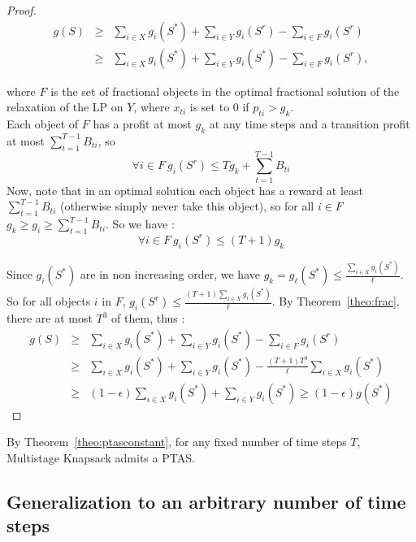 \documentclass[a4paper]{book}
\newtheorem{proof}{\noindent{\bf Proof.} }
\begin{document}
\begin{proof}
\begin{eqnarray*}
g(S) & \geq & \sum_{i\in X} g_i(S^*)+\sum_{i\in Y} g_i(S^r)-\sum_{i\in F} g_i(S^r)\\
& \geq & \sum_{i\in X} g_i(S^*)+\sum_{i\in Y} g_i(S^*)-\sum_{i\in F} g_i(S^r),
\end{eqnarray*}


\noindent where $F$ is the set of fractional objects in the optimal fractional solution of the relaxation of the LP on $Y$, where $x_{ti}$ is set to 0 if $p_{ti}>g_k$.   \\

Each object of $F$ has a profit at most $g_k$ at any time steps and a transition profit at most $\sum_{t=1}^{T-1} B_{ti}$, so 
$$\forall i \in F \  g_i(S^r) \leq Tg_k + \sum_{t=1}^{T-1} B_{ti}$$ 
Now, note that in an optimal solution each object has a reward at least $\sum_{t=1}^{T-1} B_{ti}$ (otherwise simply never take this object), so for all $i \in F$  $g_k\geq g_i\geq  \sum_{t=1}^{T-1} B_{ti}$. So we have : $$\forall i \in F \  g_i(S^r) \leq  (T+1) g_k$$


Since $g_i(S^*)$ are in non increasing order, we have $g_k=g_{\ell}(S^*)  \leq \frac{\sum_{i\in X}g_i(S^*)}{\ell}$. So for all objects $i$ in $F$, $g_i(S^r) \leq \frac{(T+1)\sum_{i\in X}g_i(S^*)}{\ell}$. By Theorem~\ref{theo:frac}, there are at most $T^3$ of them, thus : 
\begin{eqnarray*}
g(S) & \geq &\sum_{i\in X} g_i(S^*)+\sum_{i\in Y} g_i(S^*)-\sum_{i\in F} g_i(S^r)\\
& \geq &\sum_{i\in X} g_i(S^*)+\sum_{i\in Y} g_i(S^*)-\frac{(T+1)T^3}{\ell}\sum_{i\in X}g_i(S^*)\\
& \geq & (1-\epsilon)\sum_{i\in X} g_i(S^*)+\sum_{i\in Y} g_i(S^*) \geq (1-\epsilon)g(S^*)
\end{eqnarray*}
\end{proof}

By Theorem~\ref{theo:ptasconstant}, for any fixed number of time steps $T$, {\sc Multistage  Knapsack} admits a PTAS.



\subsection{Generalization to an arbitrary number of time steps}\label{sec:arbi}
\end{document}

